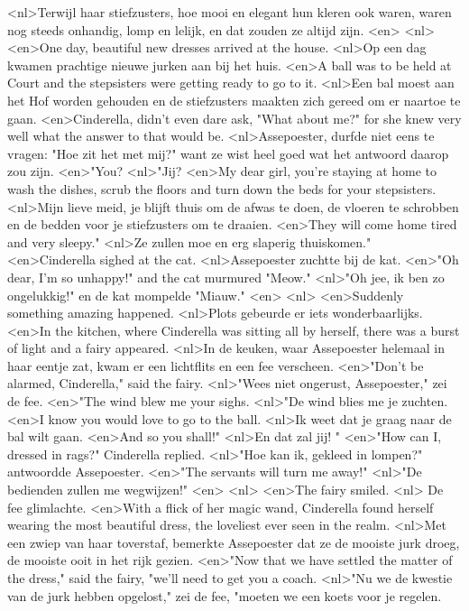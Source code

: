 <nl>Terwijl haar stiefzusters, hoe mooi en elegant hun kleren ook waren, waren nog steeds onhandig, lomp en lelijk, en dat zouden ze altijd zijn.
<en>
<nl>
<en>One day, beautiful new dresses arrived at the house.
<nl>Op een dag kwamen  prachtige nieuwe jurken aan bij het huis.
<en>A ball was to be held at Court and the stepsisters were getting ready to go to it.
<nl>Een bal moest aan het Hof worden gehouden en de stiefzusters maakten zich gereed om er naartoe te gaan.
<en>Cinderella, didn’t even dare ask, "What about me?" for she knew very well what the answer to that would be.
<nl>Assepoester, durfde niet eens te vragen: "Hoe zit het met mij?" want ze wist heel goed wat het antwoord daarop zou zijn.
<en>"You?
<nl>"Jij?
<en>My dear girl, you’re staying at home to wash the dishes, scrub the floors and turn down the beds for your stepsisters.
<nl>Mijn lieve meid, je blijft thuis om de afwas te doen, de vloeren te schrobben en de bedden voor je stiefzusters om te draaien.
<en>They will come home tired and very sleepy." 
<nl>Ze zullen moe en erg slaperig thuiskomen."
<en>Cinderella sighed at the cat.
<nl>Assepoester zuchtte bij de kat.
<en>"Oh dear, I’m so unhappy!" and the cat murmured "Meow."
<nl>"Oh jee, ik ben zo ongelukkig!" en de kat mompelde "Miauw."
<en>
<nl>
<en>Suddenly something amazing happened.
<nl>Plots gebeurde er iets wonderbaarlijks.
<en>In the kitchen, where Cinderella was sitting all by herself, there was a burst of light and a fairy appeared.
<nl>In de keuken, waar Assepoester helemaal in haar eentje zat, kwam er een lichtflits en een fee verscheen.
<en>"Don’t be alarmed, Cinderella," said the fairy.
<nl>"Wees niet ongerust, Assepoester," zei de fee.
<en>"The wind blew me your sighs.
<nl>"De wind blies me je zuchten.
<en>I know you would love to go to the ball.
<nl>Ik weet dat je graag naar de bal wilt gaan.
<en>And so you shall!"
<nl>En dat zal jij! "
<en>"How can I, dressed in rags?" Cinderella replied.
<nl>"Hoe kan ik, gekleed in lompen?" antwoordde Assepoester.
<en>"The servants will turn me away!" 
<nl>"De bedienden zullen me wegwijzen!"
<en>
<nl>
<en>The fairy smiled.
<nl> De fee glimlachte.
<en>With a flick of her magic wand, Cinderella found herself wearing the most beautiful dress, the loveliest ever seen in the realm.
<nl>Met een zwiep van haar toverstaf, bemerkte Assepoester dat ze de mooiste jurk droeg, de mooiste  ooit in het rijk gezien.
<en>"Now that we have settled the matter of the dress," said the fairy, "we’ll need to get you a coach.
<nl>"Nu we de kwestie van de jurk hebben opgelost," zei de fee, "moeten we een koets voor je regelen.
